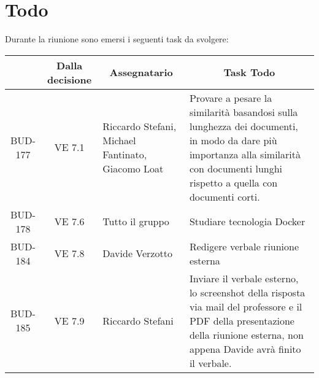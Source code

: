 

\section{Todo}

Durante la riunione sono emersi i seguenti task da svolgere:

\vspace{0.5cm}

\begin{table}[htbp]
\centering
{}
\begin{tabular}{|c|c|p{}|p{}|}
    \hline
    \rowcolor[gray]{0.75}
    \multicolumn{1}{|c|}{\textbf{Codice}} & \multicolumn{1}{|c|}{\textbf{Dalla decisione}} & \multicolumn{1}{|c|}{\textbf{Assegnatario}} & \multicolumn{1}{|c|}{\textbf{Task Todo}} \\
    \hline
    BUD-177 & VE 7.1 & Riccardo Stefani, Michael Fantinato, Giacomo Loat & Provare a pesare la similarità basandosi sulla lunghezza dei documenti, in modo da dare più importanza alla similarità con documenti lunghi rispetto a quella con documenti corti. \\
    BUD-178 & VE 7.6 & Tutto il gruppo & Studiare tecnologia Docker \\
    BUD-184 & VE 7.8 & Davide Verzotto & Redigere verbale riunione esterna \\
    BUD-185 & VE 7.9 & Riccardo Stefani & Inviare il verbale esterno, lo screenshot della risposta via mail del professore e il PDF della presentazione della riunione esterna, non appena Davide avrà finito il verbale. \\
    \hline
\end{tabular}
\end{table}
